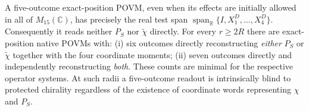 \documentclass[12pt,a4paper]{article}
\begin{document}
\begin{theorem}
\label{p2c:thm:v266-minimal-protected-readout}
A five-outcome exact-position POVM, even when its effects are initially
allowed in all of $M_{15}(\mathbb C)$, has precisely the real test span
$\operatorname{span}_{\mathbb R}\{I,X_1^D,\ldots,X_4^D\}$.
Consequently it reads neither $P_S$ nor $\widetilde\chi$ directly.
For every $r\ge2R$ there are exact-position native POVMs with:
(i) six outcomes directly reconstructing \emph{either} $P_S$ or
$\widetilde\chi$ together with the four coordinate moments;
(ii) seven outcomes directly and independently reconstructing
\emph{both}. These counts are minimal for the respective operator
systems. At such radii a five-outcome readout is intrinsically blind
to protected chirality regardless of the existence of coordinate words
representing $\chi$ and $P_S$.
\end{theorem}
\end{document}
